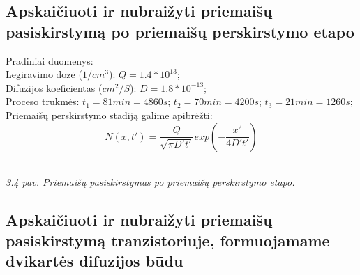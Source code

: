 \documentclass[11pt,a4paper]{article}
\begin{document}
\subsection{Apskaičiuoti ir nubraižyti priemaišų pasiskirstymą po priemaišų perskirstymo etapo}
Pradiniai duomenys:\\
Legiravimo dozė ($1/cm^3$): $Q = 1.4*10^{13}$;\\
Difuzijos koeficientas ($cm^2/S$): $D = 1.8*10^{-13}$;\\
Proceso trukmės: $t_1 = 81min = 4860s$; $t_2 = 70min = 4200s$; $t_3 = 21min = 1260s$;\\
Priemaišų perskirstymo stadiją galime apibrėžti:\\
\begin{equation}
N(x,t') = \frac{Q}{\sqrt{\pi D' t'}} exp \left( - \frac{x^2}{4D't'} \right)
\end{equation}

\\
\textsl{3.4 pav.  Priemaišų pasiskirstymas po priemaišų perskirstymo etapo.}

\subsection{Apskaičiuoti ir nubraižyti priemaišų pasiskirstymą tranzistoriuje, formuojamame dvikartės difuzijos būdu}
\end{document}
